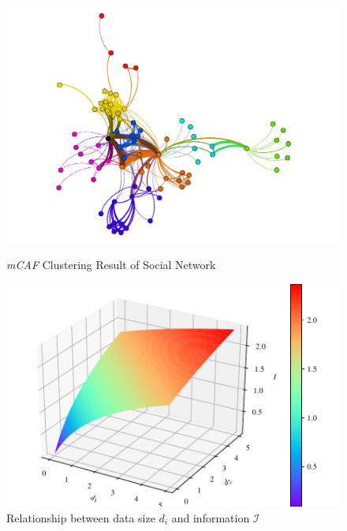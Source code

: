 \documentclass{mcmthesis}
\begin{document}
\begin{figure}[!htb]
\begin{minipage}[t]{0.48\textwidth}
	\begin{center}
\includegraphics[width=\linewidth]{fig/cluster.png}
\caption{\emph{mCAF} Clustering Result of Social Network}
\label{fig:mcaf}
\end{center}
\end{minipage}
\hspace{0.04\textwidth}
\begin{minipage}[t]{0.48\textwidth}
\begin{center}
\includegraphics[width=\linewidth]{fig/network_effect.pdf}
\caption{Relationship between data size $d_i$ and information $\mathcal{I}$}
\label{fig:dI}
\end{center}
\end{minipage}
\end{figure}
\end{document}
